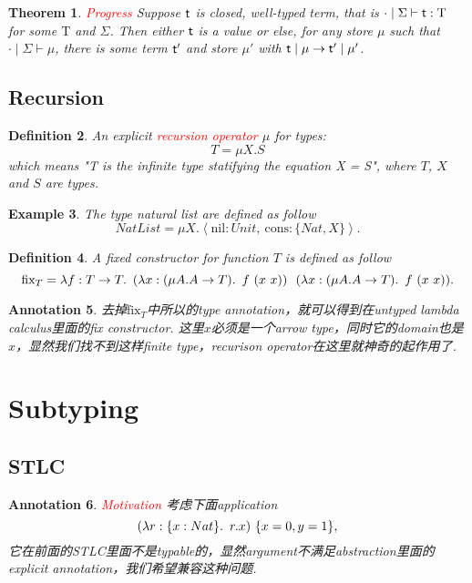 \documentclass{article}
\theoremstyle{plain}
\newtheorem{theorem}{Theorem}
\newtheorem{example}[theorem]{Example}
\newtheorem{definition}[theorem]{Definition}
\newtheorem{annotation}[theorem]{Annotation}
\theoremstyle{nonumberplain}
\newcommand{\lam}[2]{\ensuremath{\lambda #1\ldotp~ #2}} %
\newcommand{\singletype}[1]{\text{#1}}
\newcommand{\termtype}[2]{\ensuremath{#1:#2}}
\newcommand{\term}[1]{\ensuremath\mathsf{#1}}
\newcommand{\redt}[1]{\textcolor{red}{#1}}
\begin{document}
\begin{theorem}
\rm \redt{Progress} Suppose $\term{t}$ is closed, well-typed term, that is $\cdot \mid \Sigma \vdash \termtype{\term{t}}{\singletype{T}}$ for some $\singletype{T}$ and $\Sigma$. Then either $\term{t}$ is a value or else, for any store $\mu$ such that $\cdot \mid \Sigma \vdash \mu$, there is some term $\term{t}'$ and store $\mu'$ with $\term{t} \mid \mu \to \term{t}' \mid \mu'$.
\end{theorem}

\newpage
\subsection{Recursion}

\begin{definition}
\rm An explicit \redt{recursion operator} $\mu$ for types:
$$
T = \mu X. S 
$$
which means "T is the infinite type statifying the equation X = S", where $T$, $X$ and $S$ are types.
\end{definition}

\begin{example}
\rm The type natural list are defined as follow
$$
NatList = \mu X. \left<\text{nil}:Unit,~\text{cons}:\{Nat,X\} \right>. 
$$
\end{example}

\begin{definition}
\rm A fixed constructor for function $T$ is defined as follow
$$
\text{fix}_T = \lam{f:T \to T}{(\lam{x:(\mu A.A\to T)}{f~(x~x)})~~(\lam{x:(\mu A.A\to T)}{f~(x~x)})}.
$$
\end{definition}


\begin{annotation}
\rm 去掉$\text{fix}_T$中所以的type annotation，就可以得到在untyped lambda calculus里面的fix constructor. 这里$x$必须是一个arrow type，同时它的domain也是$x$，显然我们找不到这样finite type，recurison operator在这里就神奇的起作用了. 
\end{annotation}
\newpage
\section{Subtyping}

\subsection{STLC}
\begin{annotation}
\rm \redt{Motivation} 考虑下面application
$$
(\lam{\termtype{r}{\{x:Nat\}}}{r.x})~\{x=0,y=1\},
$$
它在前面的STLC里面不是typable的，显然argument不满足abstraction里面的explicit annotation，我们希望兼容这种问题. 
\end{annotation}
\end{document}
